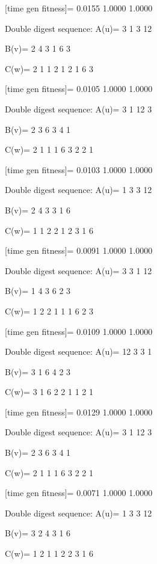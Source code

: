 [time gen fitness]=
    0.0155    1.0000    1.0000

Double digest sequence:
A(u)=
     3     1     3    12

B(v)=
     2     4     3     1     6     3

C(w)=
     2     1     1     2     1     2     1     6     3

[time gen fitness]=
    0.0105    1.0000    1.0000

Double digest sequence:
A(u)=
     3     1    12     3

B(v)=
     2     3     6     3     4     1

C(w)=
     2     1     1     1     6     3     2     2     1

[time gen fitness]=
    0.0103    1.0000    1.0000

Double digest sequence:
A(u)=
     1     3     3    12

B(v)=
     2     4     3     3     1     6

C(w)=
     1     1     2     2     1     2     3     1     6

[time gen fitness]=
    0.0091    1.0000    1.0000

Double digest sequence:
A(u)=
     3     3     1    12

B(v)=
     1     4     3     6     2     3

C(w)=
     1     2     2     1     1     1     6     2     3

[time gen fitness]=
    0.0109    1.0000    1.0000

Double digest sequence:
A(u)=
    12     3     3     1

B(v)=
     3     1     6     4     2     3

C(w)=
     3     1     6     2     2     1     1     2     1

[time gen fitness]=
    0.0129    1.0000    1.0000

Double digest sequence:
A(u)=
     3     1    12     3

B(v)=
     2     3     6     3     4     1

C(w)=
     2     1     1     1     6     3     2     2     1

[time gen fitness]=
    0.0071    1.0000    1.0000

Double digest sequence:
A(u)=
     1     3     3    12

B(v)=
     3     2     4     3     1     6

C(w)=
     1     2     1     1     2     2     3     1     6

